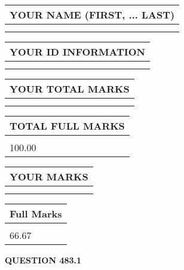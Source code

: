 \documentclass{ctexart}
\begin{document}
   
   
   
\newpage 
\setcounter{page}{ 
   483001 } 
   
   
   
   
\noindent\begin{tabular}{|l|}
\hline
YOUR NAME (FIRST, ... LAST)  \\
\hline
 \\ 
 \\ 
\hline
\end{tabular}
\hspace{0.05in} \begin{tabular}{|l|}
\hline
 YOUR   ID   INFORMATION  \\
\hline
 \\ 
 \\ 
\hline
\end{tabular}
   
   
\vspace{0.2in}\noindent\begin{tabular}{|l|}
\hline
YOUR TOTAL MARKS  \\
\hline
 \\ 
 \\ 
\hline
\end{tabular}
\hspace{0.05in} \begin{tabular}{|l|}
\hline
TOTAL FULL MARKS  \\
\hline
 \\ 
100.00 \\
\hline
\end{tabular}
   
   
 \vspace{0.2in}
 
 
 
 
   
   
  
\vspace{0.2in}
  
\noindent\begin{tabular}{|l|}
\hline
 YOUR MARKS  \\
\hline
 \\ 
 \\ 
\hline
\end{tabular}
\hspace{0.05in} \begin{tabular}{|l|}
\hline
 Full Marks  \\
\hline
 \\ 
66.67 \\
\hline
\end{tabular}
{\textbf{\Large{QUESTION
483.1 
}}}
  
\end{document}
